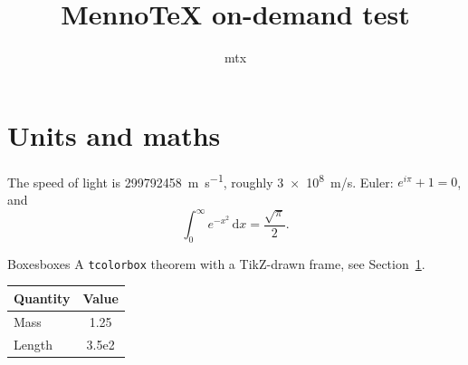 \documentclass[11pt]{article}
\title{MennoTeX on-demand test}
\author{mtx}
\begin{document}
\maketitle

\section{Units and maths}\label{sec:units}
The speed of light is \SI{299792458}{\metre\per\second}, roughly
\qty{3e8}{m/s}. Euler: $e^{i\pi}+1=0$, and
\begin{equation}
  \int_0^\infty e^{-x^2}\,\mathrm{d}x = \frac{\sqrt{\pi}}{2}.
\end{equation}

\begin{theo}{Boxes}{boxes}
  A \texttt{tcolorbox} theorem with a TikZ-drawn frame, see
  Section~\ref{sec:units}.
\end{theo}

\begin{tcolorbox}[enhanced,breakable,title=Breakable box,colback=yellow!10]
  \begin{tabular}{lS}
    \toprule
    Quantity & {Value} \\
    \midrule
    Mass & 1.25 \\
    Length & 3.5e2 \\
    \bottomrule
  \end{tabular}
\end{tcolorbox}
\end{document}
